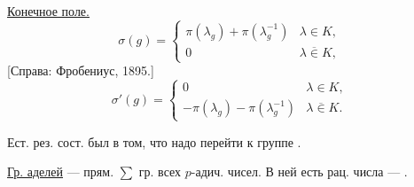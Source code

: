 \underline{Конечное поле.}
\begin{equation*}
\sigma(g)=\begin{cases}
\pi(\lambda_g)+\pi(\lambda_g^{-1})&\lambda\in K,\\
0&\lambda{\overline{\in}}K,
\end{cases}
\end{equation*}
[Справа: Фробениус, 1895.]
\begin{equation*}
\sigma'(g)=\begin{cases}
0&\lambda\in K,\\
-\pi(\lambda_g)-\pi(\lambda_g^{-1})&\lambda{\overline{\in}}K.
\end{cases}
\end{equation*}

\par\noindent\begin{minipage}{\linewidth}
\textcolor{orange!65!black}{Ест. рез. сост.} был в том, что надо перейти к группе .
\end{minipage}\par
\underline{Гр. аделей} --- прям. $\sum$ гр. всех $p$-адич. чисел.
В ней есть рац. числа --- .

